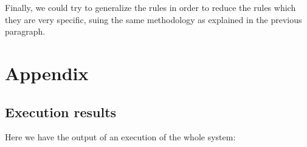 \documentclass[]{article}
\begin{document}
Finally, we could try to generalize the rules in order to reduce the rules which they are very specific, suing the same methodology as explained in the previous paragraph.

\section*{Appendix}
\subsection*{Execution results}

Here we have the output of an execution of the whole system:


\end{document}
